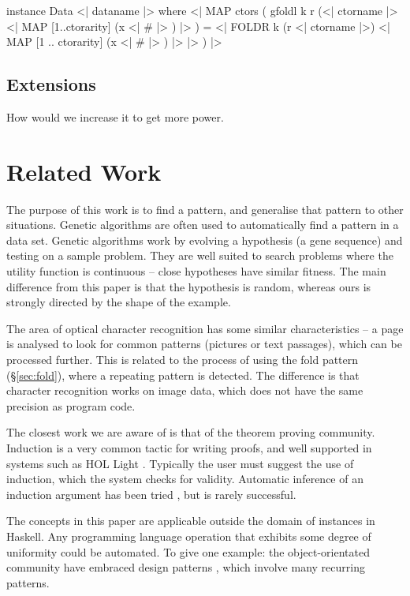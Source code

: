 \documentclass[preprint]{sigplanconf}
\begin{document}
\ignore\begin{code}
instance Data \? <| dataname |> where
    <| MAP ctors (
        gfoldl k r
            (<| ctorname |> \? <| MAP [1..ctorarity] (x <| # |> ) |> ) =
            <| FOLDR k (r \? <| ctorname |>)
                <| MAP [1 .. ctorarity] (x <| # |> ) |>
            |>
    ) |>
\end{code}

\subsection{Extensions}

How would we increase it to get more power.

\section{Related Work}
\label{sec:related}

The purpose of this work is to find a pattern, and generalise that pattern to other situations. Genetic algorithms \cite{genetic_algorithms} are often used to automatically find a pattern in a data set. Genetic algorithms work by evolving a hypothesis (a gene sequence) and testing on a sample problem. They are well suited to search problems where the utility function is continuous -- close hypotheses have similar fitness. The main difference from this paper is that the hypothesis is random, whereas ours is strongly directed by the shape of the example.

The area of optical character recognition \cite{ocr} has some similar characteristics -- a page is analysed to look for common patterns (pictures or text passages), which can be processed further. This is related to the process of using the fold pattern (\S\ref{sec:fold}), where a repeating pattern is detected. The difference is that character recognition works on image data, which does not have the same precision as program code.

The closest work we are aware of is that of the theorem proving community. Induction is a very common tactic for writing proofs, and well supported in systems such as HOL Light \cite{hol_light}. Typically the user must suggest the use of induction, which the system checks for validity. Automatic inference of an induction argument has been tried \cite{mintchev:reasoning}, but is rarely successful.

The concepts in this paper are applicable outside the domain of instances in Haskell. Any programming language operation that exhibits some degree of uniformity could be automated. To give one example: the object-orientated community have embraced design patterns \cite{design_patterns}, which involve many recurring patterns.
\end{document}
